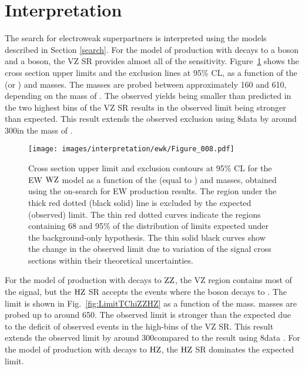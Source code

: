 \section{Interpretation}
\noindent
\justify
The search for electroweak superpartners is interpreted using the models described in Section \ref{search}.
For the model of \firstcharg\secondchi production with decays to a \PZ boson and a \PW boson, the VZ SR provides almost all of the sensitivity.
Figure~\ref{fig:LimitTChiWZ} shows the cross section upper limits and the exclusion lines at 95\% CL, as a function of the \firstcharg (or \secondchi) and \firstchi masses.
The \firstcharg masses are probed between approximately 160 and 610\GeV, depending on the mass of \firstchi.
The observed yields being smaller than predicted in the two highest \ptmiss bins of the VZ SR results in the observed limit being stronger than expected.
This result extends the observed exclusion using 8\TeV data by around 300\GeV in the mass of \firstcharg \cite{Khachatryan:2015lwa}.
\begin{figure}[hb]
 \centering
   \texttt{[image: images/interpretation/ewk/Figure\_008.pdf]}
   \caption{\label{fig:LimitTChiWZ}
     Cross section upper limit and exclusion contours at 95\% CL for the EW $\mathrm{W}\mathrm{Z}$ model
     as a function of the \firstcharg (equal to \secondchi) and \firstchi masses,
     obtained using the on-\PZ search for EW production results.
     The region under the thick red dotted (black solid) line is excluded by the expected (observed) limit.
     The thin red dotted curves indicate the regions containing 68 and 95\% of the distribution of limits
     expected under the background-only hypothesis.
     The thin solid black curves show the change in the observed limit due to
     variation of the signal cross sections within their theoretical uncertainties.
   }
\end{figure}
\newpara
\noindent\justify
For the model of \firstchi\firstchi production with decays to $\mathrm{Z}\mathrm{Z}$, the VZ region contains most of the signal, but the $\mathrm{H}\mathrm{Z}$ SR accepts the events where the \PZ boson decays to \bbbar.
The limit is shown in Fig.~\ref{fig:LimitTChiZZHZ} as a function of the \firstchi mass.  
\firstchi masses are probed up to around 650\GeV.
The observed limit is stronger than the expected due to the deficit of observed events in the high-\ptmiss bins of the VZ SR.
This result extends the observed limit by around 300\GeV compared to the result using 8\TeV data \cite{Khachatryan:2015lwa}.
For the model of \firstchi\firstchi production with decays to $\mathrm{H}\mathrm{Z}$, the $\mathrm{H}\mathrm{Z}$ SR dominates the expected limit.
